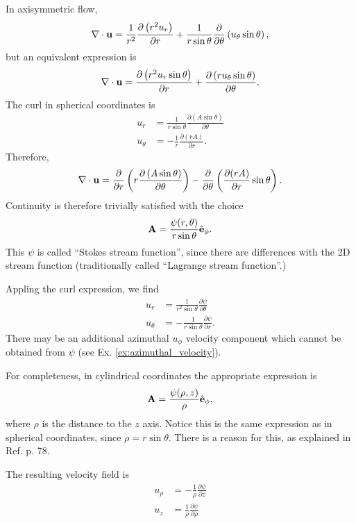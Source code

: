 In axisymmetric flow,
\[
  \nabla\cdot\mathbf{u} =
  {1 \over r^2}{\partial \left( r^2 u_r \right) \over  \partial r} +
  {1 \over r\sin\theta}{\partial \over \partial  \theta} \left( u_\theta\sin\theta \right) ,
\]
but an equivalent expression is
\[
  \nabla\cdot\mathbf{u} =
  {\partial \left( r^2 u_r \sin\theta \right) \over  \partial r} +
  {\partial \left( r u_\theta\sin\theta \right)  \over \partial  \theta} .
\]
The curl in spherical coordinates is
\begin{align}
  u_r     &= \frac {1}{r\sin \theta }
            \frac{ \partial  \left( A  \sin \theta \right) }{\partial \theta }  \\
  u_\theta &= -\frac1{r} \frac{\partial (rA) }{\partial r} .
\end{align}
Therefore,
\[
  \nabla\cdot\mathbf{u} =
  {\partial\over\partial r} \left( r
      \frac{ \partial  \left( A  \sin \theta \right) }{\partial \theta }
    \right)  -
  {\partial \over \partial  \theta}  \left(
      \frac{\partial (rA) }{\partial r} 
      \sin\theta \right)  .
\]
Continuity is therefore trivially satisfied with the choice
\begin{equation}
  \label{eq:Stokes_stream_spherical}
  \mathbf{A} = \frac{\psi(r,\theta)}{r \sin\theta } \hat{\mathbf{e}}_\phi .    
\end{equation}
%
This $\psi$ is called ``Stokes stream function'', since there are differences with the 2D stream function
  (traditionally called ``Lagrange stream function''.)

Appling the curl expression, we find
\begin{equation}
  \label{eq:u_from_psi_spherical}
  \begin{split}
    u_r     &=  \frac1{r^2 \sin\theta} \frac{\partial \psi}{\partial \theta} \\
    u_\theta &= -\frac1{r   \sin\theta} \frac{\partial \psi}{\partial r} .
  \end{split}
\end{equation}
%
There may be an additional azimuthal $u_\phi$ velocity component
which cannot be obtained from $\psi$ (see Ex. \ref{ex:azimuthal_velocity}).


For completeness, in cylindrical coordinates the appropriate
expression is
\[
  \mathbf{A} = \frac{\psi(\rho, z)}{ \rho } \hat{\mathbf{e}}_\phi ,
\]
where $\rho$ is the distance to the $z$ axis. Notice this is the same
expression as in spherical coordinates, since
$\rho=r\sin\theta$. There is a reason for this, as explained in
Ref. \cite{batchelor} p. 78.


The resulting velocity field is
\begin{equation*}
  \begin{split}
    u_\rho   &= - \frac1{\rho} \frac{\partial \psi}{\partial z} \\
    u_z     &=   \frac1{\rho} \frac{\partial \psi}{\partial \rho}
  \end{split}
\end{equation*}


